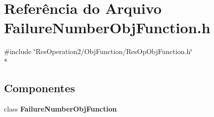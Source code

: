 \section{Referência do Arquivo Failure\+Number\+Obj\+Function.\+h}
\label{_2_obj_function_2_failure_number_2_failure_number_obj_function_8h}
{\ttfamily \#include \char`\"{}Res\+Operation2/\+Obj\+Function/\+Res\+Op\+Obj\+Function.\+h\char`\"{}}\\*
\subsection*{Componentes}
\begin{DoxyCompactItemize}
\item 
class {\bf Failure\+Number\+Obj\+Function}
\end{DoxyCompactItemize}
